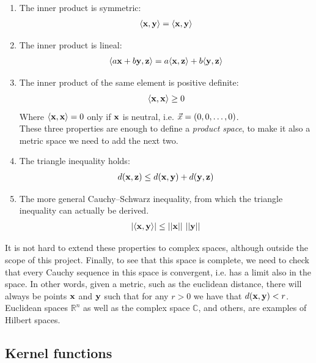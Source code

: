 \begin{enumerate}
    \item The inner product is symmetric:
    \begin{align*}
        \langle\mathbf{x}, \mathbf{y}\rangle = \langle\mathbf{x}, \mathbf{y}\rangle
    \end{align*}
    \item The inner product is lineal:
    \begin{align*}
        \langle a\mathbf{x} + b\mathbf{y}, \mathbf{z}\rangle = a\langle\mathbf{x}, \mathbf{z}\rangle + b\langle\mathbf{y}, \mathbf{z}\rangle 
    \end{align*}
    \item The inner product of the same element is positive definite:
    \begin{align*}
        \langle\mathbf{x}, \mathbf{x}\rangle \ge 0
    \end{align*}
    Where $\langle\mathbf{x}, \mathbf{x}\rangle = 0$ only if $\mathbf{x}$ is neutral, i.e. $\vec{x} = (0,0,\dots, 0)$. \\
    These three properties are enough to define a \emph{product space}, to make it also a metric space we need to add the next two.
    \item The triangle inequality holds:
    \begin{align*}
        d(\mathbf{x}, \mathbf{z}) \le d(\mathbf{x}, \mathbf{y}) + d(\mathbf{y}, \mathbf{z}) 
    \end{align*}
    \item The more general Cauchy–Schwarz inequality, from which the triangle in\-equal\-i\-ty can actually be derived.
    \begin{align*}
        |\langle\mathbf{x}, \mathbf{y}\rangle| \le ||\mathbf{x}||\ ||\mathbf{y}|| 
    \end{align*}
\end{enumerate}

It is not hard to extend these properties to complex spaces, although outside the scope of this project. Finally, to see that this space is complete, we need to check that every Cauchy sequence in this space is convergent, i.e. has a limit also in the space. In other words, given a metric, such as the euclidean distance, there will always be points $\mathbf{x}$ and $\mathbf{y}$ such that for any $r > 0$ we have that $d(\mathbf{x}, \mathbf{y}) < r$. Euclidean spaces $\mathbb{R}^n$ as well as the complex space $\mathbb{C}$, and others, are examples of Hilbert spaces.

\subsection{Kernel functions}

